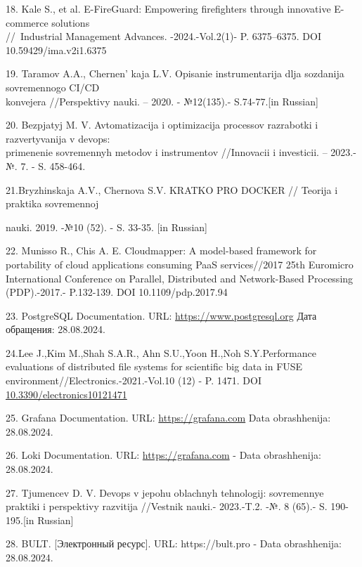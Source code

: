 \begin{references}
18. Kale S., et al. E-FireGuard: Empowering firefighters through
innovative E-commerce solutions \\//~Industrial Management
Advances. -2024.-Vol.2(1)- P. 6375--6375. DOI 10.59429/ima.v2i1.6375

19. Taramov A.A., Chernen' kaja L.V. Opisanie
instrumentarija dlja sozdanija sovremennogo CI/CD \\konvejera
//Perspektivy nauki. -- 2020. - №12(135).- S.74-77.{[}in Russian{]}

20. Bezpjatyj M. V. Avtomatizacija i optimizacija processov razrabotki i
razvertyvanija v devops: \\primenenie sovremennyh metodov i instrumentov
//Innovacii i investicii. -- 2023.- №. 7. - S. 458-464.

21.Bryzhinskaja A.V., Chernova S.V. KRATKO PRO DOCKER // Teorija i
praktika sovremennoj

nauki. 2019. -№10 (52). - S. 33-35. {[}in Russian{]}

22. Munisso R., Chis A. E. Cloudmapper: A model-based framework for
portability of cloud applications consuming PaaS services//2017 25th
Euromicro International Conference on Parallel, Distributed and
Network-Based Processing (PDP).-2017.- P.132-139. DOI
10.1109/pdp.2017.94

23. PostgreSQL Documentation. URL:
\href{https://www.postgresql.org/docs/-}{https://www.postgresql.org} Дата обращения: 28.08.2024.

24.Lee J.,Kim M.,Shah S.A.R., Ahn S.U.,Yoon H.,Noh S.Y.Performance
evaluations of distributed file systems for scientific big data in FUSE
environment//Electronics.-2021.-Vol.10 (12) - P. 1471. DOI\\
\href{https://doi.org/10.3390/electronics10121471}{10.3390/electronics10121471}

25. Grafana Documentation. URL: \href{https://grafana.com/docs/-}{https://grafana.com} Data
obrashhenija: 28.08.2024.

26. Loki Documentation. URL: \href{https://grafana.com/oss/loki/}{https://grafana.com} - Data
obrashhenija: \\28.08.2024.

27. Tjumencev D. V. Devops v jepohu oblachnyh tehnologij: sovremennye
praktiki i perspektivy razvitija //Vestnik nauki.- 2023.-T.2. -№. 8
(65).- S. 190-195.{[}in Russian{]}

28. BULT. {[}Электронный ресурс{]}. URL: https://bult.pro - Data
obrashhenija: 28.08.2024.
\end{references}

